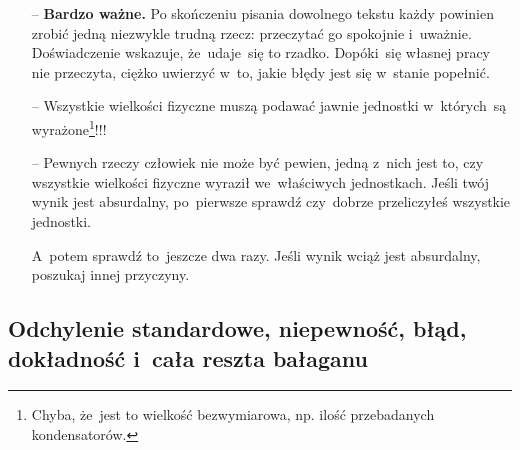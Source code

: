 \documentclass[a4paper,11pt]{article}
\begin{document}
\begin{itemize}
\item[--] \textbf{Bardzo ważne.} Po skończeniu pisania dowolnego
  tekstu każdy powinien zrobić jedną niezwykle trudną rzecz:
  przeczytać go spokojnie i~uważnie. Doświadczenie wskazuje,
  że~udaje~się to rzadko. Dopóki~się własnej pracy nie przeczyta,
  ciężko uwierzyć w~to, jakie błędy jest się w~stanie popełnić.

\item[--] Wszystkie wielkości fizyczne muszą podawać jawnie jednostki
  w~których~są wyrażone\footnote{Chyba, że~jest to wielkość
    bezwymiarowa, np. ilość przebadanych kondensatorów.}!!!

\item[--] Pewnych rzeczy człowiek nie może być pewien, jedną z~nich
  jest to, czy wszystkie wielkości fizyczne wyraził we~właściwych
  jednostkach. Jeśli twój wynik jest absurdalny, po~pierwsze sprawdź
  czy~dobrze przeliczyłeś wszystkie jednostki.

  A~potem sprawdź to~jeszcze dwa razy. Jeśli wynik wciąż jest
  absurdalny, poszukaj innej przyczyny.
\end{itemize}





\subsection{Odchylenie standardowe, niepewność, błąd, dokładność
  i~cała reszta bałaganu}
\label{sec:odchylenie}
\end{document}
